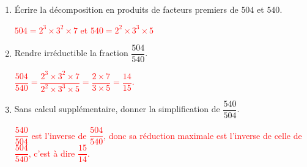     \begin{enumerate}
        \item Écrire la décomposition en produits de facteurs premiers de $504$ et $540$.

        \textcolor{red}{
            $504 = 2^3\times 3^2\times 7$ et $540 = 2^2\times 3^3\times 5$
        }
        \item Rendre irréductible la fraction $\dfrac{504}{540}$.

        \textcolor{red}{
            $\dfrac{504}{540} = \dfrac{2^3\times 3^2\times 7}{2^2\times 3^3\times 5} = \dfrac{2\times 7}{3\times 5} = \dfrac{14}{15}$.
        }
        \item Sans calcul supplémentaire, donner la simplification de $\dfrac{540}{504}$.

        \textcolor{red}{
            $\dfrac{540}{504}$ est l'inverse de $\dfrac{504}{540}$, donc sa réduction maximale est l'inverse de celle de $\dfrac{504}{540}$, c'est à dire $\dfrac{15}{14}$.
        }
    \end{enumerate}

